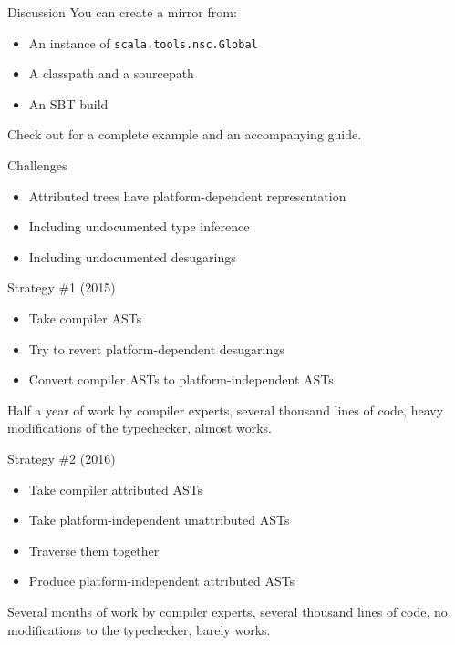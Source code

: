 \documentclass[svgnames,dvipsnames,hyperref={bookmarks=false},usepdftitle=false]{beamer}
\begin{document}
\begin{frame}{Discussion}
You can create a mirror from:
\begin{itemize}
\item An instance of \texttt{scala.tools.nsc.Global}
\item A classpath and a sourcepath
\item An SBT build
\end{itemize}

\vskip15pt
Check out 
for a complete example and an accompanying guide.
\end{frame}


\begin{frame}{Challenges}
\begin{itemize}
\item Attributed trees have platform-dependent representation
\item Including undocumented type inference
\item Including undocumented desugarings
\end{itemize}
\end{frame}

\begin{frame}{Strategy \#1 (2015)}
\begin{itemize}
\item Take compiler ASTs
\item Try to revert platform-dependent desugarings
\item Convert compiler ASTs to platform-independent ASTs
\end{itemize}
\vskip15pt
Half a year of work by compiler experts,
several thousand lines of code,
heavy modifications of the typechecker,
almost works.
\end{frame}

\begin{frame}{Strategy \#2 (2016)}
\begin{itemize}
\item Take compiler attributed ASTs
\item Take platform-independent unattributed ASTs
\item Traverse them together
\item Produce platform-independent attributed ASTs
\end{itemize}
\vskip15pt
Several months of work by compiler experts,
several thousand lines of code,
no modifications to the typechecker,
barely works.
\end{frame}
\end{document}
